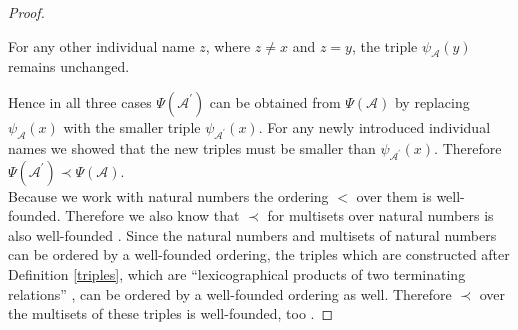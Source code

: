 \documentclass{book}
\theoremstyle{break}
\theoremstyle{definition}
\begin{document}
\begin{proof}
\begin{itemize}
For any other individual name $z$, where $z\neq x$ and $z=y$, the triple $\psi_\mathcal{A}(y)$ remains unchanged.
\end{itemize}
Hence in all three cases $\Psi(\mathcal{A}^\prime)$ can be obtained from $\Psi(\mathcal{A})$ by replacing $\psi_\mathcal{A}(x)$ with the smaller triple $\psi_{\mathcal{A}^\prime}(x)$. For any newly introduced individual names we showed that the new triples must be smaller than $\psi_{\mathcal{A}^\prime}(x)$. Therefore $\Psi(\mathcal{A}^\prime)\prec\Psi(\mathcal{A})$.\\
Because we work with natural numbers the ordering $<$ over them is well-founded. Therefore we also know that $\prec$ for multisets over natural numbers is also well-founded \cite[Theorem 2.5.5]{bn}. Since the natural numbers and multisets of natural numbers can be ordered by a well-founded ordering, the triples which are constructed after Definition \ref{triples}, which are ``lexicographical products of two terminating relations'' \cite[Theorem 2.4.2]{bn}, can be ordered by a well-founded ordering as well. Therefore $\prec$ over the multisets of these triples is well-founded, too \cite[Theorem 2.5.5]{bn}.  
\end{proof}
\end{document}

